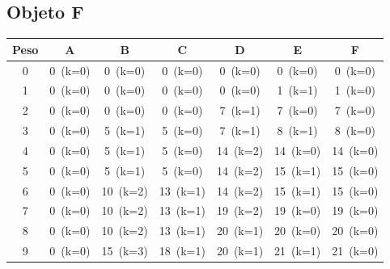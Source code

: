 \documentclass[12pt]{article}
\begin{document}
\begin{landscape}
\subsection*{Objeto F}
\begin{longtable}{ccccccc}
\toprule
Peso & A & B & C & D & E & F \\
\midrule
0 & \cellcolor{red!20}0~(k=0) & \cellcolor{red!20}0~(k=0) & \cellcolor{red!20}0~(k=0) & \cellcolor{red!20}0~(k=0) & \cellcolor{red!20}0~(k=0) & \cellcolor{red!20}0~(k=0) \\
1 & \cellcolor{red!20}0~(k=0) & \cellcolor{red!20}0~(k=0) & \cellcolor{red!20}0~(k=0) & \cellcolor{red!20}0~(k=0) & \cellcolor{green!40}1~(k=1) & \cellcolor{red!20}1~(k=0) \\
2 & \cellcolor{red!20}0~(k=0) & \cellcolor{red!20}0~(k=0) & \cellcolor{red!20}0~(k=0) & \cellcolor{green!40}7~(k=1) & \cellcolor{red!20}7~(k=0) & \cellcolor{red!20}7~(k=0) \\
3 & \cellcolor{red!20}0~(k=0) & \cellcolor{green!40}5~(k=1) & \cellcolor{red!20}5~(k=0) & \cellcolor{green!40}7~(k=1) & \cellcolor{green!40}8~(k=1) & \cellcolor{red!20}8~(k=0) \\
4 & \cellcolor{red!20}0~(k=0) & \cellcolor{green!40}5~(k=1) & \cellcolor{red!20}5~(k=0) & \cellcolor{green!40}14~(k=2) & \cellcolor{red!20}14~(k=0) & \cellcolor{red!20}14~(k=0) \\
5 & \cellcolor{red!20}0~(k=0) & \cellcolor{green!40}5~(k=1) & \cellcolor{red!20}5~(k=0) & \cellcolor{green!40}14~(k=2) & \cellcolor{green!40}15~(k=1) & \cellcolor{red!20}15~(k=0) \\
6 & \cellcolor{red!20}0~(k=0) & \cellcolor{green!40}10~(k=2) & \cellcolor{green!40}13~(k=1) & \cellcolor{green!40}14~(k=2) & \cellcolor{green!40}15~(k=1) & \cellcolor{red!20}15~(k=0) \\
7 & \cellcolor{red!20}0~(k=0) & \cellcolor{green!40}10~(k=2) & \cellcolor{green!40}13~(k=1) & \cellcolor{green!40}19~(k=2) & \cellcolor{red!20}19~(k=0) & \cellcolor{red!20}19~(k=0) \\
8 & \cellcolor{red!20}0~(k=0) & \cellcolor{green!40}10~(k=2) & \cellcolor{green!40}13~(k=1) & \cellcolor{green!40}20~(k=1) & \cellcolor{yellow!50}20~(k=0) & \cellcolor{red!20}20~(k=0) \\
9 & \cellcolor{red!20}0~(k=0) & \cellcolor{green!40}15~(k=3) & \cellcolor{green!40}18~(k=1) & \cellcolor{green!40}20~(k=1) & \cellcolor{green!40}21~(k=1) & \cellcolor{red!20}21~(k=0) \\

\end{longtable}
\end{landscape}
\end{document}
